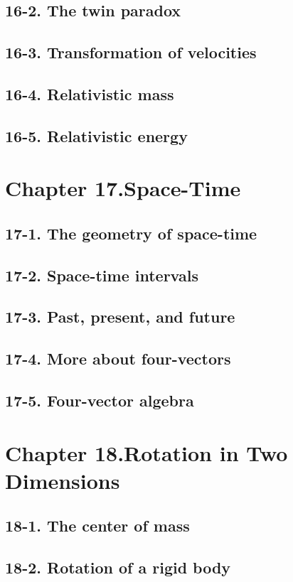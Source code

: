 \documentclass{article}
\begin{document}
\subsection{16-2. The twin paradox}
\subsection{16-3. Transformation of velocities}
\subsection{16-4. Relativistic mass}
\subsection{16-5. Relativistic energy}
\section{Chapter 17.Space-Time}
\subsection{17-1. The geometry of space-time}
\subsection{17-2. Space-time intervals}
\subsection{17-3. Past, present, and future}
\subsection{17-4. More about four-vectors}
\subsection{17-5. Four-vector algebra}
\section{Chapter 18.Rotation in Two Dimensions}
\subsection{18-1. The center of mass}
\subsection{18-2. Rotation of a rigid body}
\end{document}
